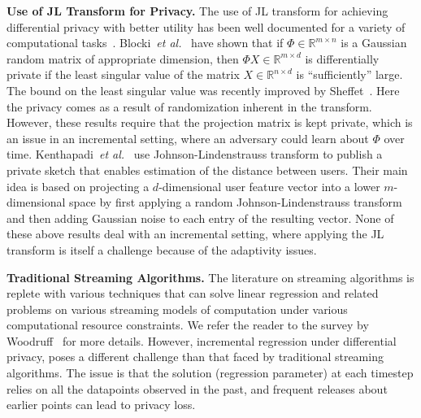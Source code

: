 \documentclass{article}
\theoremstyle{plain}
\def \y {\mathbf y}
\def \CCC {\mathcal{C}}
\def \R {\mathbb{R}}
\begin{document}
\smallskip
\noindent\textbf{Use of JL Transform for Privacy.}
The use of JL transform for achieving differential privacy with better utility has been well documented for a variety of computational tasks~\cite{zhou2009differential,blocki2012johnson,kenthapadi2013privacy,sheffet2015private,upadhyay2014randomness}. Blocki~\emph{et al.}\ \cite{blocki2012johnson} have shown that if $\Phi \in \R^{m \times n}$ is a Gaussian random matrix of appropriate dimension, then $\Phi X \in \R^{m \times d}$ is differentially private  if the least singular value of the matrix $X \in \R^{n \times d}$ is ``sufficiently'' large. The bound on the least singular value was recently improved by Sheffet~\cite{sheffet2015private}. Here the privacy comes as a result of randomization inherent in the transform. However, these results require that the projection matrix is kept private, which is an issue in an incremental setting, where an adversary could learn about $\Phi$ over time. Kenthapadi~\emph{et al.}\ \cite{kenthapadi2013privacy} use Johnson-Lindenstrauss transform to publish a private sketch that enables estimation of the distance between users. Their main idea is based on projecting a $d$-dimensional user feature vector into a lower $m$-dimensional space by first applying a random Johnson-Lindenstrauss transform and then adding Gaussian noise to each entry of the resulting vector. None of these above results deal with an incremental setting, where applying the JL transform is itself a challenge because of the adaptivity issues.

\smallskip
\noindent\textbf{Traditional Streaming Algorithms.}
The literature on streaming algorithms is replete with various techniques that can solve linear regression and related problems on various streaming models of computation under various computational resource constraints. We refer the reader to the survey by Woodruff~\cite{TCS-060} for more details. However, incremental regression under differential privacy, poses a different challenge than that faced by traditional streaming algorithms. The issue is that the solution (regression parameter) at each timestep relies on all the datapoints observed in the past, and frequent releases about earlier points can lead to privacy loss. 
\end{document}
